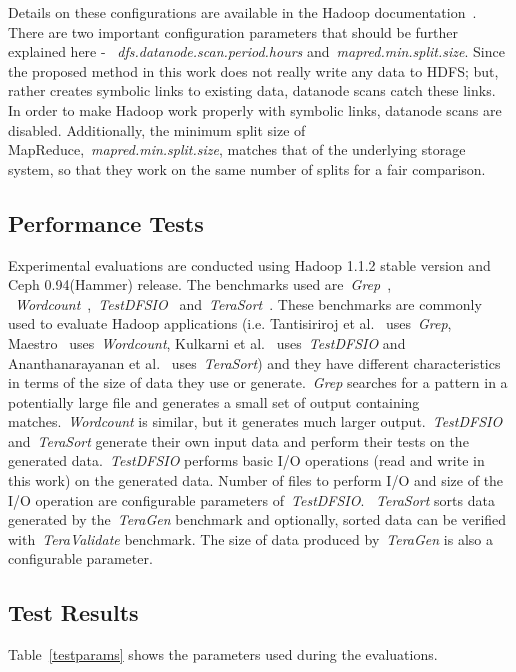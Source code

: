 \documentclass[preprint,12pt]{elsarticle}
\begin{document}
Details on these configurations are available in the Hadoop documentation~\cite{hadoopconf}.
There are two important configuration parameters that should be further explained here -
~\textit{dfs.datanode.scan.period.hours} and~\textit{mapred.min.split.size}. Since the
proposed method in this work does not really write any data to HDFS; but, rather creates
symbolic links to existing data, datanode scans catch these links. In order to make Hadoop
work properly with symbolic links, datanode scans are disabled. Additionally, the minimum
split size of MapReduce,~\textit{mapred.min.split.size}, matches that of the underlying
storage system, so that they work on the same number of splits for a fair comparison.

\subsection{Performance Tests}
Experimental evaluations are conducted using Hadoop 1.1.2 stable version and
Ceph 0.94(Hammer) release. The benchmarks used are~\textit{Grep}~\cite{hadoopgrep},
~\textit{Wordcount}~\cite{hadoopwordcount},~\textit{TestDFSIO}~\cite{hadooptestdfsio}
and~\textit{TeraSort}~\cite{hadoopterasort}. These benchmarks are commonly used to evaluate
Hadoop applications (i.e. Tantisiriroj et al.~\cite{Tantisiriroj:2011:DDF:2063384.2063474}
uses~\textit{Grep}, Maestro~\cite{6217451} uses~\textit{Wordcount}, Kulkarni et
al.~\cite{hadoopyarnprogress} uses~\textit{TestDFSIO} and Ananthanarayanan et
al.~\cite{Ananthanarayanan:2009:CAW:1855533.1855548} uses~\textit{TeraSort})
and they have different characteristics in terms of the size of data
they use or generate.~\textit{Grep} searches for a pattern in a potentially large file
and generates a small set of output containing matches.~\textit{Wordcount} is similar,
but it generates much larger output.~\textit{TestDFSIO} and~\textit{TeraSort} generate
their own input data and perform their tests on the generated data.~\textit{TestDFSIO}
performs basic I/O operations (read and write in this work) on the generated data. Number of
files to perform I/O and size of the I/O operation are configurable parameters of~\textit{TestDFSIO}.
~\textit{TeraSort} sorts data generated by the~\textit{TeraGen} benchmark and optionally, sorted
data can be verified with~\textit{TeraValidate} benchmark. The size of data produced by~\textit{TeraGen}
is also a configurable parameter.

\subsection{Test Results}
Table~\ref{testparams} shows the parameters used during the evaluations.
\end{document}
